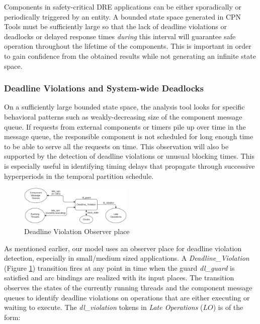 Components in safety-critical DRE applications can be either sporadically or periodically triggered by an entity. A bounded state space generated in CPN Tools must be sufficiently large so that the lack of deadline violations or deadlocks or delayed response times \emph{during} this interval will guarantee safe operation throughout the lifetime of the components. This is important in order to gain confidence from the obtained results while not generating an infinite state space. 

\subsubsection{Deadline Violations and System-wide Deadlocks}

On a sufficiently large bounded state space, the analysis tool looks for specific behavioral patterns such as weakly-decreasing size of the component message queue. If requests from external components or timers pile up over time in the message queue, the responsible component is not scheduled for long enough time to be able to serve all the requests on time. This observation will also be supported by the detection of deadline violations or unusual blocking times. This is especially useful in identifying timing delays that propagate through successive hyperperiods in the temporal partition schedule. 

\begin{figure}[htb]
	\centering
	\includegraphics[width=0.48\textwidth]{figs/Deadline_Violations.png}
	\caption{Deadline Violation Observer place}
	\label{fig:DL}
\end{figure}

As mentioned earlier, our model uses an observer place for deadline violation detection, especially in small/medium sized applications. A \emph{Deadline\_Violation} (Figure \ref{fig:DL}) transition fires at any point in time when the guard \emph{dl\_guard} is satisfied and arc bindings are realized with its input places. The transition observes the states of the currently running threads and the component message queues to identify deadline violations on operations that are either executing or waiting to execute. The \emph{dl\_violation} tokens in \emph{Late Operations} ($LO$) is of the form:

